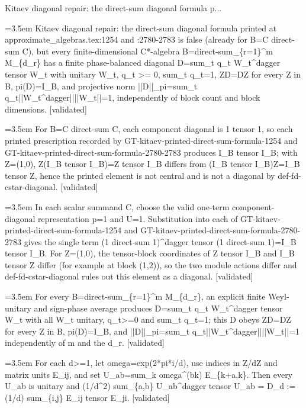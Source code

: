 \documentclass{article}
\newcommand{\step}[1]{\par\noindent\hangindent=3.5em\hangafter=1%
  \makebox[3.5em][l]{\textbf{#1.}}}
\newcommand{\steptag}[1]{\hfill{\small\textsf{[#1]}}}
\begin{document}
\begin{proofbox}{Kitaev diagonal repair: the direct-sum diagonal formula p...}
\step{1} Kitaev diagonal repair: the direct-sum diagonal formula printed at approximate\_algebras.tex:1254 and :2780-2783 is false (already for B=C direct-sum C), but every finite-dimensional C*-algebra B=direct-sum\_\{r=1\}\textasciicircum{}m M\_\{d\_r\} has a finite phase-balanced diagonal D=sum\_t q\_t W\_t\textasciicircum{}dagger tensor W\_t with unitary W\_t, q\_t >= 0, sum\_t q\_t=1, ZD=DZ for every Z in B, pi(D)=I\_B, and projective norm ||D||\_pi=sum\_t q\_t||W\_t\textasciicircum{}dagger||||W\_t||=1, independently of block count and block dimensions. \steptag{validated} \\[6pt]
\step{1.1} For B=C direct-sum C, each component diagonal is 1 tensor 1, so each printed prescription recorded by GT-kitaev-printed-direct-sum-formula-1254 and GT-kitaev-printed-direct-sum-formula-2780-2783 produces I\_B tensor I\_B; with Z=(1,0), Z(I\_B tensor I\_B)=Z tensor I\_B differs from (I\_B tensor I\_B)Z=I\_B tensor Z, hence the printed element is not central and is not a diagonal by def-fd-cstar-diagonal. \steptag{validated} \\[6pt]
\step{1.1.1} In each scalar summand C, choose the valid one-term component-diagonal representation p=1 and U=1. Substitution into each of GT-kitaev-printed-direct-sum-formula-1254 and GT-kitaev-printed-direct-sum-formula-2780-2783 gives the single term (1 direct-sum 1)\textasciicircum{}dagger tensor (1 direct-sum 1)=I\_B tensor I\_B. For Z=(1,0), the tensor-block coordinates of Z tensor I\_B and I\_B tensor Z differ (for example at block (1,2)), so the two module actions differ and def-fd-cstar-diagonal rules out this element as a diagonal. \steptag{validated} \\[4pt]
\step{1.2} For every B=direct-sum\_\{r=1\}\textasciicircum{}m M\_\{d\_r\}, an explicit finite Weyl-unitary and sign-phase average produces D=sum\_t q\_t W\_t\textasciicircum{}dagger tensor W\_t with all W\_t unitary, q\_t>=0 and sum\_t q\_t=1; this D obeys ZD=DZ for every Z in B, pi(D)=I\_B, and ||D||\_pi=sum\_t q\_t||W\_t\textasciicircum{}dagger||||W\_t||=1 independently of m and the d\_r. \steptag{validated} \\[6pt]
\step{1.2.1} For each d>=1, let omega=exp(2*pi*i/d), use indices in Z/dZ and matrix units E\_ij, and set U\_ab=sum\_k omega\textasciicircum{}(bk) E\_\{k+a,k\}. Then every U\_ab is unitary and (1/d\textasciicircum{}2) sum\_\{a,b\} U\_ab\textasciicircum{}dagger tensor U\_ab = D\_d := (1/d) sum\_\{i,j\} E\_ij tensor E\_ji. \steptag{validated} \\[6pt]

\end{proofbox}
\end{document}
